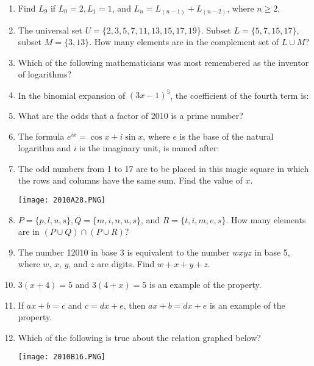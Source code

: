 \documentclass[../uilmath.tex]{subfiles}
\begin{document}
\begin{enumerate}[label=\bfseries\arabic*.]
    \item %
    Find $L_9$ if $L_0=2,L_1=1$, and $L_n=L_(n-1)+L_(n-2)$, where $n\geq 2$.

    \item %
    The universal set $U=\{2,3,5,7,11,13,15,17,19\}$. Subset $L=\{5,7,15,17\}$, subset $M=\{3,13\}$. 
    How many elements are in the complement set of $L\cup M$?

    \item %
    Which of the following mathematicians was most remembered as the inventor of logarithms?

    \item %
    In the binomial expansion of $(3x-1)^5$, the coefficient of the fourth term is:

    \item %
    What are the odds that a factor of 2010 is a prime number?

    \item %
    The formula $e^{ix}=\cos x + i\sin x$, where $e$ is the base of the natural logarithm and $i$ is the imaginary unit, is named after:

    \item %
    The odd numbers from 1 to 17 are to be placed in this magic square in which the rows and columns have the same sum. Find the value of $x$.
    \begin{center}
        \texttt{[image: 2010A28.PNG]}
    \end{center}

    \item %
    $P=\{p,l,u,s\}, Q=\{m,i,n,u,s\}$, and $R=\{t,i,m,e,s\}$. How many elements are in $(P\cup Q)\cap (P\cup R)$?

    \item %
    The number 12010 in base 3 is equivalent to the number $wxyz$ in base 5, where $w$, $x$, $y$, and $z$ are digits. Find $w+x+y+z$.

    \item %
    $3(x+4)=5$ and $3(4+x)=5$ is an example of the \blank property.

    \item %
    If $ax+b=c$ and $c=dx+e$, then $ax+b=dx+e$ is an example of the \blank property.

    \item %
    Which of the following is true about the relation graphed below?
    \begin{center}
        \texttt{[image: 2010B16.PNG]}
    \end{center}


\end{enumerate}
\end{document}
